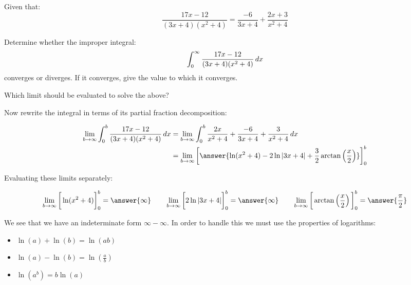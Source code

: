 \documentclass{ximera}
\author{Jim Talamo}
\begin{document}
\begin{exercise}
Given that: 
\[ \dfrac{17x-12}{(3x+4)(x^2+4)} = \dfrac{-6}{3x+4} + \dfrac{2x+3}{x^2+4} \]

Determine whether the improper integral:
\[ \displaystyle \int_0^{\infty} \dfrac{17x-12}{(3x+4)(x^2+4)} \mathop{}\!d x \]
 converges or diverges.  If it converges, give the value to which it converges.  

Which limit should be evaluated to solve the above?

\begin{multipleChoice}
\end{multipleChoice}

\begin{exercise}

Now rewrite the integral in terms of its partial fraction decomposition:

\begin{align*}
\lim_{b\rightarrow \infty} \int_{0}^{b}
\frac{17x-12}{(3x+4)(x^2+4)} \d x&=
\lim_{b\rightarrow \infty} \int_{0}^{b}
 \frac{2x}{x^2+4}+
\frac{-6}{3x+4}+
\frac{3}{x^2+4}  \d x \\
&= \lim_{b\rightarrow \infty} \eval{ \answer{\ln(x^2+4)-2 \ln|3x+4|+\frac{3}{2} \arctan\left(\frac{x}{2}\right)}}_0^b
\end{align*}




\begin{exercise}

Evaluating these limits separately:

\[ \lim_{b\rightarrow \infty} \eval{\ln(x^2+4)}_0^b = \answer{\infty}  \qquad   \lim_{b\rightarrow \infty} \eval{2 \ln|3x+4|}_0^b = \answer{\infty}   \qquad    \lim_{b\rightarrow \infty} \eval{ \arctan\left(\frac{x}{2}\right)}_0^b = \answer{\frac{\pi}{2}} \]

\begin{exercise}
We see that we have an indeterminate form $\infty - \infty$.  In order to handle this we must use the properties of logarithms:

\begin{itemize}
\item $\ln(a)+\ln(b) = \ln(ab)$
\item $\ln(a)-\ln(b) = \ln\left(\frac{a}{b}\right)$
\item $\ln\left(a^b\right) = b \ln(a)$
\end{itemize}


\end{exercise}
\end{exercise}
\end{exercise}
\end{exercise}
\end{document}
